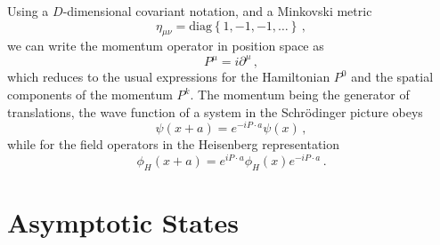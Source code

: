 Using a $D$-dimensional covariant notation, and a Minkovski metric 
\begin{equation}
    \label{eq:MostlyMinus}
    \eta_{\mu\nu} = \mathrm{diag}\left\{1, -1, -1, \ldots \right\}\, ,
\end{equation}
we can write the momentum operator in position space as
\begin{equation}
    \label{eq:MomOp}
    P^\mu = i \partial^\mu\, ,
\end{equation}
which reduces to the usual expressions for the Hamiltonian $P^0$ and the spatial
components of the momentum $P^k$. The momentum being the generator of
translations, the wave function of a system in the Schr\"odinger picture obeys
\begin{equation}
    \label{eq:PsiTranslation}
    \psi\left(x+a\right) = e^{-i P\cdot a} \psi\left(x\right)\, ,
\end{equation}
while for the field operators in the Heisenberg representation
\begin{equation}
    \label{eq:PhiTranslation}
    \phi_H(x+a) = e^{i P\cdot a} \phi_H(x) e^{-i P\cdot a}\, .
\end{equation}

\section{Asymptotic States}
\label{sec:AsymptStates}


